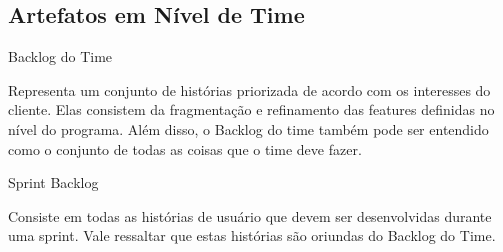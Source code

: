 {\large{\subsection{Artefatos em Nível de Time \\}}}
\begin{itemize}

{
	\large{\item Backlog do Time \\}

	\tab Representa um conjunto de histórias priorizada de acordo com os interesses do cliente. Elas consistem da fragmentação e refinamento das features definidas no nível do programa. Além disso, o Backlog do time também pode ser entendido como o conjunto de todas as coisas que o time deve fazer. \\
}

{
	\large{\item Sprint Backlog\\}

	\tab Consiste em todas as histórias de usuário que devem ser desenvolvidas durante uma sprint. Vale ressaltar que estas histórias são oriundas do Backlog do Time. \\
}
\end{itemize}

